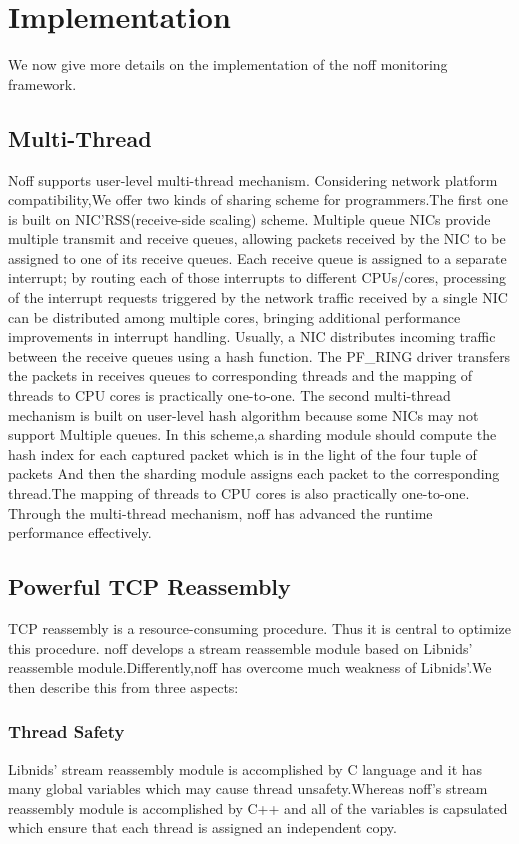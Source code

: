 \documentclass[conference]{IEEEtran}
\begin{document}
\section{Implementation}
We now give more details on the implementation of the noff monitoring framework.
\subsection{Multi-Thread}
Noff supports user-level multi-thread mechanism. Considering network platform compatibility,We offer two kinds of sharing scheme for programmers.The first one is built on NIC'RSS(receive-side scaling) scheme.
\newline\indent Multiple queue NICs provide multiple transmit and receive queues, allowing packets received by the NIC to be assigned to one of its receive queues. Each receive queue is assigned to a separate interrupt; by routing each of those interrupts to different CPUs/cores, processing of the interrupt requests triggered by the network traffic received by a single NIC can be distributed among multiple cores, bringing additional performance improvements in interrupt handling. Usually, a NIC distributes incoming traffic between the receive queues using a hash function.
\newline\indent The PF\_RING driver transfers the packets in receives queues to corresponding threads and the mapping of threads to CPU cores is practically one-to-one.
The second multi-thread mechanism is built on user-level hash algorithm because some NICs may not support Multiple queues. In this scheme,a sharding module should compute the hash index for each captured packet which is in the light of the four tuple of packets And then the sharding module assigns each packet to the corresponding thread.The mapping of threads to CPU cores is also practically one-to-one.
Through the multi-thread mechanism, noff has advanced the runtime performance effectively.
\subsection{Powerful TCP Reassembly}
TCP reassembly is a resource-consuming procedure. Thus it is central to optimize this procedure. noff develops a stream reassemble module based on Libnids' reassemble module.Differently,noff has overcome much weakness of Libnids'.We then describe this from three aspects:
\subsubsection{Thread Safety}
Libnids' stream reassembly module is accomplished by C language and it has many global variables which may cause thread unsafety.Whereas noff's stream reassembly module is accomplished by C++ and all of the variables is capsulated which ensure that each thread is assigned an independent copy.
\end{document}
